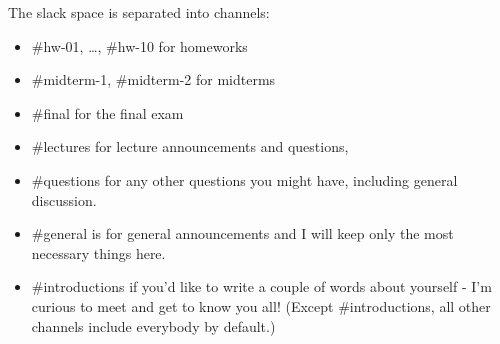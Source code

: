 \documentclass[oneside,11pt]{amsart}
\begin{document}
The slack space is separated into channels:
\begin{itemize}
	\item 
		\#hw-01, \ldots,  \#hw-10 for homeworks
	\item 
\#midterm-1, \#midterm-2 for midterms 
\item 
\#final for the final exam
\item 
\#lectures for lecture announcements and questions, 
\item 
\#questions for any other questions you might have, including general discussion.
\item 
\#general is for general announcements and I will keep only the most necessary things here.
\item 
\#introductions if you’d like to write a couple of words about yourself - I’m curious to meet and get to know you all!
(Except \#introductions, all other channels include everybody by default.)
\end{itemize}

%
\end{document}

